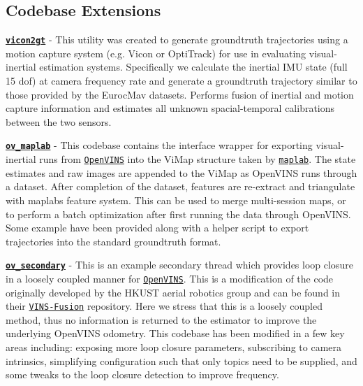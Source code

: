 \subsection*{Codebase Extensions}


\begin{DoxyItemize}
\item {\bfseries \href{https://github.com/rpng/vicon2gt}{\tt vicon2gt}} -\/ This utility was created to generate groundtruth trajectories using a motion capture system (e.\+g. Vicon or Opti\+Track) for use in evaluating visual-\/inertial estimation systems. Specifically we calculate the inertial I\+MU state (full 15 dof) at camera frequency rate and generate a groundtruth trajectory similar to those provided by the Euroc\+Mav datasets. Performs fusion of inertial and motion capture information and estimates all unknown spacial-\/temporal calibrations between the two sensors.
\item {\bfseries \href{https://github.com/rpng/ov_maplab}{\tt ov\+\_\+maplab}} -\/ This codebase contains the interface wrapper for exporting visual-\/inertial runs from \href{https://github.com/rpng/open_vins}{\tt Open\+V\+I\+NS} into the Vi\+Map structure taken by \href{https://github.com/ethz-asl/maplab}{\tt maplab}. The state estimates and raw images are appended to the Vi\+Map as Open\+V\+I\+NS runs through a dataset. After completion of the dataset, features are re-\/extract and triangulate with maplab\textquotesingle{}s feature system. This can be used to merge multi-\/session maps, or to perform a batch optimization after first running the data through Open\+V\+I\+NS. Some example have been provided along with a helper script to export trajectories into the standard groundtruth format.
\item {\bfseries \href{https://github.com/rpng/ov_secondary}{\tt ov\+\_\+secondary}} -\/ This is an example secondary thread which provides loop closure in a loosely coupled manner for \href{https://github.com/rpng/open_vins}{\tt Open\+V\+I\+NS}. This is a modification of the code originally developed by the H\+K\+U\+ST aerial robotics group and can be found in their \href{https://github.com/HKUST-Aerial-Robotics/VINS-Fusion}{\tt V\+I\+N\+S-\/\+Fusion} repository. Here we stress that this is a loosely coupled method, thus no information is returned to the estimator to improve the underlying Open\+V\+I\+NS odometry. This codebase has been modified in a few key areas including\+: exposing more loop closure parameters, subscribing to camera intrinsics, simplifying configuration such that only topics need to be supplied, and some tweaks to the loop closure detection to improve frequency.
\end{DoxyItemize}

